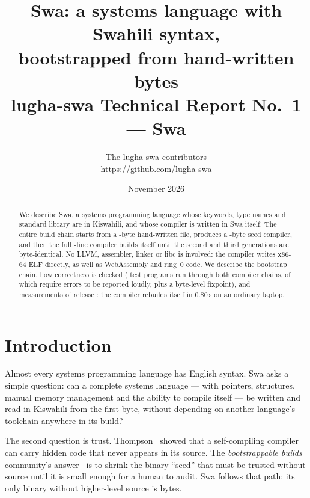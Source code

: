 \documentclass[11pt,a4paper]{article}
\title{\textbf{Swa: a systems language with Swahili syntax,\\bootstrapped from \KwanzaBaiti{} hand-written bytes}\\[0.5em]
\large lugha-swa Technical Report No.~1 --- Swa \Toleo}
\author{The lugha-swa contributors\\\small\url{https://github.com/lugha-swa}}
\date{November 2026}
\begin{document}
\maketitle

\begin{abstract}
\noindent We describe Swa, a systems programming language whose keywords, type names and standard library are in Kiswahili, and whose compiler is written in Swa itself. The entire build chain starts from a \KwanzaBaiti-byte hand-written file, produces a \MbeguBaiti-byte seed compiler, and then the full \MkusanyajiMistari-line compiler builds itself until the second and third generations are byte-identical. No LLVM, assembler, linker or libc is involved: the compiler writes x86-64 ELF directly, as well as WebAssembly and ring~0 code. We describe the bootstrap chain, how correctness is checked (\MajaribioProgramu{} test programs run through both compiler chains, \MajaribioKata{} of which require errors to be reported loudly, plus a byte-level fixpoint), and measurements of release \Toleo: the compiler rebuilds itself in 0.80\,s on an ordinary laptop.
\end{abstract}

\section{Introduction}

Almost every systems programming language has English syntax. Swa asks a simple question: can a complete systems language --- with pointers, structures, manual memory management and the ability to compile itself --- be written and read in Kiswahili from the first byte, without depending on another language's toolchain anywhere in its build?

The second question is trust. Thompson~\cite{thompson1984} showed that a self-compiling compiler can carry hidden code that never appears in its source. The \emph{bootstrappable builds} community's answer~\cite{bootstrappable} is to shrink the binary ``seed'' that must be trusted without source until it is small enough for a human to audit. Swa follows that path: its only binary without higher-level source is \KwanzaBaiti{} bytes.
\end{document}
